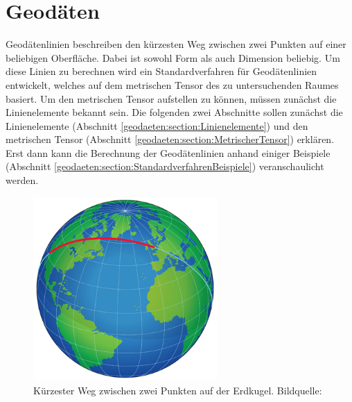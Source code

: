 %
%
%
%
\chapter{Geodäten\label{chapter:geodaeten}}
\begin{refsection}
%
%

\noindent
Geodätenlinien beschreiben den kürzesten Weg zwischen zwei Punkten auf einer beliebigen Oberfläche.
%
Dabei ist sowohl Form als auch Dimension beliebig.
Um diese Linien zu berechnen wird ein Standardverfahren für Geodätenlinien entwickelt, welches auf dem metrischen Tensor des zu untersuchenden Raumes basiert.
Um den metrischen Tensor aufstellen zu können, müssen zunächst die Linienelemente bekannt sein.
%
%
Die folgenden zwei Abschnitte sollen zunächst die Linienelemente (Abschnitt \ref{geodaeten:section:Linienelemente}) und den metrischen Tensor (Abschnitt \ref{geodaeten:section:MetrischerTensor}) erklären.
Erst dann kann die Berechnung der Geodätenlinien anhand einiger Beispiele (Abschnitt \ref{geodaeten:section:StandardverfahrenBeispiele}) veranschaulicht werden.

\begin{figure}
	\centering
	\includegraphics[width=7cm]{papers/geodaeten/Abbildungen/Orthodromic_air_route}
	\caption{Kürzester Weg zwischen zwei Punkten auf der Erdkugel. Bildquelle: \cite{geodaeten:Geodäte}}
	\label{geodaeten:figure:Geodaeten:Erdkugel}
\end{figure}






\printbibliography[heading=subbibliography]
\end{refsection}
